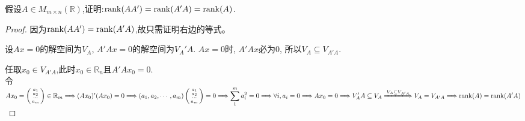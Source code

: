 \begin{example}
  假设\(A\in M_{m\times n}(\mathbb{R})\),证明:\(\operatorname{rank}(AA')=\operatorname{rank}(A'A)=\operatorname{rank}(A)\).
\end{example}

\begin{proof}
  因为\(\operatorname{rank}(AA')=\operatorname{rank}(A'A)\),故只需证明右边的等式。

  设\(Ax=0\)的解空间为\(V_A\), \(A'Ax=0\)的解空间为\(V_A'A\). \(Ax=0\)时, \(A'Ax\)必为\(0\),
  所以\(V_A\subseteq V_{A'A}\).

  任取\(x_0\in V_{A'A}\),此时\(x_0\in\mathbb{R}_n\)且\(A'Ax_0=0\).\\
  令\(Ax_0=\left(\begin{smallmatrix}a_1\\
                                    a_2\\
                                    \cdots\\
                                    a_m\end{smallmatrix}\right)\in\mathbb{R}_m
                                \Longrightarrow (Ax_0)'(Ax_0)=0 \Longrightarrow
                                (a_1,a_2,\cdots,a_m)\left(\begin{smallmatrix}a_1\\
                                    a_2\\
                                    \cdots\\
                                    a_m\end{smallmatrix}\right)=0\\
                                \Longrightarrow \displaystyle\sum_1^ma_i^2=0
                                \Longrightarrow \forall i, a_i=0
                                \Longrightarrow Ax_0=0
                                \Longrightarrow V_A'A\subseteq V_A
                                \xLongrightarrow{V_A\subseteq V_{A'A}}V_A=V_{A'A}\\
                                \Longrightarrow \rank(A)=\rank(A'A)\)
\end{proof}

